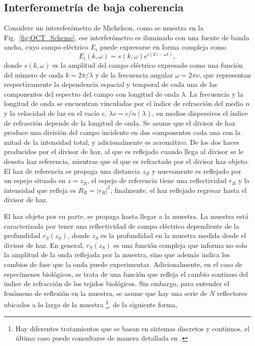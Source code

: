 \subsection{Interferometría de baja coherencia}

Considere un intereferómetro de Michelson, como se muestra en la Fig.~\ref{fig:OCT_Scheme}, ese interferómetro es iluminado con una fuente de banda ancha, cuyo campo eléctrico $E_i$ puede expresarse en forma compleja como
\begin{equation}
	E_i(k,\omega) = s(k,\omega) e^{i(kz - \omega t)},
\end{equation}
donde $s(k,\omega)$ es la amplitud del campo eléctrico expresado como una función del número de onda $k = 2\pi /\lambda$ y de la frecuencia angular $\omega = 2\pi \nu$, que representan respectivamente la dependencia espacial y temporal de cada una de las componentes del espectro del campo con longitud de onda $\lambda$. La frecuencia y la longitud de onda se encuentran vinculadas por el índice de refracción del medio $n$ y la velocidad de luz en el vacío $c$, $\lambda \nu = c / n(\lambda)$, en medios dispersivos el índice de refracción depende de la longitud de onda. Se asume que el divisor de haz produce una división del campo incidente en dos componentes cada una con la mitad de la intensidad total, y adicionalmente es acromático. De los dos haces producidos por el divisor de haz, al que es reflejado cuando llega al divisor se le denota haz referencia, mientras que el que es refractado por el divisor haz objeto. El haz de referencia se propaga una distancia $z_R$ y nuevamente es reflejado por un espejo situado en $z = z_R$, el espejo de referencia tiene una reflectividad $r_R$ y la intensidad que refleja es $R_R = |r_R|^2$, finalmente, el haz reflejado regresar hasta el divisor de haz. 

El haz objeto por su parte, se propaga hasta llegar a la muestra. La muestra está caracterizada por tener una reflectividad de campo eléctrico dependiente de la profundidad $r_S(z_S)$, donde $z_S$ es la profundidad en la muestra medida desde el divisor de haz. En general, $r_S(z_S)$ es una función compleja que informa no solo la amplitud de la onda reflejada por la muestra, sino que además indica los cambios de fase que la onda puede experimentar. Adicionalmente, en el caso de especímenes biológicos, se trata de una función que refleja el cambio continuo del índice de refracción de los tejidos biológicos. Sin embargo, para entender el fenómeno de reflexión en la muestra, se asume que hay una serie de $N$ reflectores ubicados a lo largo de la muestra \footnote{Hay diferentes tratamientos que se basan en sistemas discretos y continuos, el último caso puede consultarse de manera detallada en \cite{Brezinski2005,Fercher}.}, de la siguiente forma, 

